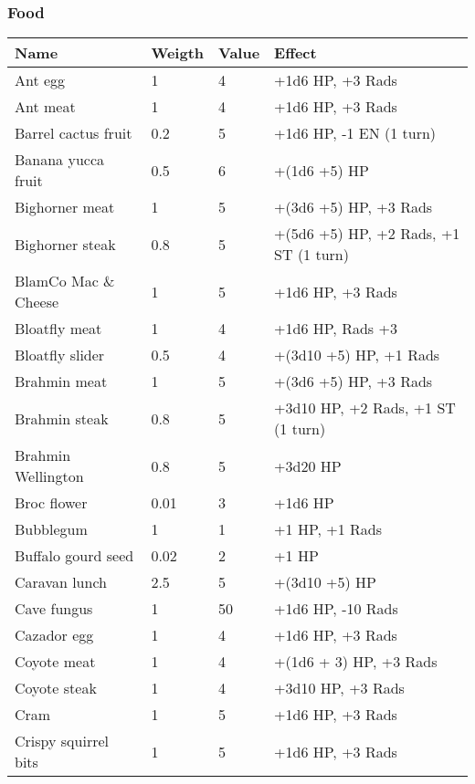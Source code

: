 


\subsubsection{Food}
\begin{longtable}{|p{4cm}|p{1.5cm}|p{1.5cm}|p{9cm}|}
\hline
\bfseries Name & \bfseries Weigth & \bfseries Value & \bfseries Effect \\
\hline
\endhead
Ant egg & 1 & 4 & +1d6 HP, +3 Rads \\
Ant meat & 1 & 4 & +1d6 HP, +3 Rads \\
Barrel cactus fruit & 0.2 & 5 & +1d6 HP, -1 EN (1 turn) \\
Banana yucca fruit & 0.5 & 6 & +(1d6 +5) HP \\
Bighorner meat & 1 & 5 & +(3d6 +5) HP, +3 Rads \\
Bighorner steak & 0.8 & 5 & +(5d6 +5) HP, +2 Rads, +1 ST (1 turn) \\
BlamCo Mac \& Cheese & 1 & 5 & +1d6 HP, +3 Rads \\
Bloatfly meat & 1 & 4 & +1d6 HP, Rads +3 \\
Bloatfly slider & 0.5 & 4 & +(3d10 +5) HP, +1 Rads \\
Brahmin meat & 1 & 5 & +(3d6 +5) HP, +3 Rads \\
Brahmin steak & 0.8 & 5 & +3d10 HP, +2 Rads, +1 ST (1 turn) \\
Brahmin Wellington & 0.8 & 5 & +3d20 HP \\
Broc flower & 0.01 & 3 & +1d6 HP \\
Bubblegum & 1 & 1 & +1 HP, +1 Rads \\
Buffalo gourd seed & 0.02 & 2 & +1 HP \\
Caravan lunch & 2.5 & 5 & +(3d10 +5) HP \\
Cave fungus & 1 & 50 & +1d6 HP, -10 Rads \\
Cazador egg & 1 & 4 & +1d6 HP, +3 Rads \\
Coyote meat & 1 & 4 & +(1d6 + 3) HP, +3 Rads \\
Coyote steak & 1 & 4 & +3d10 HP, +3 Rads \\
Cram & 1 & 5 & +1d6 HP, +3 Rads \\
Crispy squirrel bits & 1 & 5 & +1d6 HP, +3 Rads \\

\end{longtable}
